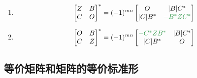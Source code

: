 \documentclass[./linear_algebra.tex]{subfiles}
\begin{document}
\begin{enumerate}
\begin{enumerate}
\[\begin{bmatrix}
                      \color[rgb]{0.2, 0.6, 0.3}{-C^{*}ZB^*} & |B|C^{*}
                \end{bmatrix}
            \]
            \item
            \[
                \begin{bmatrix}
                    Z & B \\
                    C & O
                \end{bmatrix}^{*}
                = (-1)^{mn}\begin{bmatrix}
                               O        & |B|C^{*}                               \\
                               |C|B^{*} & \color[rgb]{0.2, 0.6, 0.3}{-B^{*}ZC^*}
                \end{bmatrix}
            \]
            \item
            \[
                \begin{bmatrix}
                    O & B \\
                    C & Z
                \end{bmatrix}^{*}
                = (-1)^{mn}\begin{bmatrix}
                               \color[rgb]{0.2, 0.6, 0.3}{-C^{*}ZB^*} & |B|C^{*} \\
                               |C|B^{*}                               & O
                \end{bmatrix}
            \]
        \end{enumerate}
    \end{enumerate}

    \subsection{等价矩阵和矩阵的等价标准形}
\end{document}
